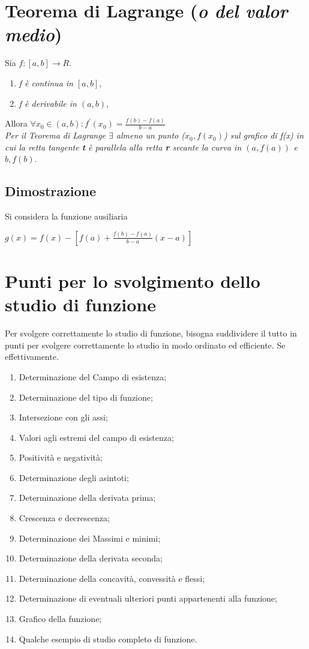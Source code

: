 \documentclass{book}
\begin{document}
\section{Teorema di Lagrange ({\em o del valor medio})}
Sia $f:[a,b]\to R$.
\begin{enumerate}
	\item \textit{f è continua in $[a,b]$},
	\item \textit{f è derivabile in $(a,b)$},
\end{enumerate}
Allora $\forall x_0\in(a,b):f^\prime (x_0)=\frac{f(b)-f(a)}{b-a}$\\
\textit{Per il Teorema di Lagrange $\exists$ almeno un punto ($x_0,f(x_0)$) sul
grafico di f(x) in cui la retta tangente \textbf{t} è parallela alla retta
\textbf{r} secante la curva in $(a,f(a))$ e $b,f(b)$}.
\subsection{Dimostrazione}
Si considera la funzione ausiliaria 
\begin{center}
	$g(x)=f(x)-[f(a)+\frac{f(b)-f(a)}{b-a}(x-a)]$
\end{center}


\section{Punti per lo svolgimento dello studio di funzione}
Per svolgere correttamente lo studio di funzione, bisogna suddividere il tutto
in punti per svolgere correttamente lo studio in modo ordinato ed efficiente.
Se effettivamente. 
\begin{enumerate}
	\item Determinazione del Campo di esistenza;
	\item Determinazione del tipo di funzione;
	\item Intersezione con gli assi;
	\item Valori agli estremi del campo di esistenza;
	\item Positività e negatività;
	\item Determinazione degli asintoti;
	\item Determinazione della derivata prima;
	\item Crescenza e decrescenza;
	\item Determinazione dei Massimi e minimi;
	\item Determinazione della derivata seconda;
	\item Determinazione della concavità, convessità e flessi;
	\item Determinazione di eventuali ulteriori punti appartenenti alla
		funzione;
	\item Grafico della funzione;
	\item Qualche esempio di studio completo di funzione.
\end{enumerate}
\end{document}
